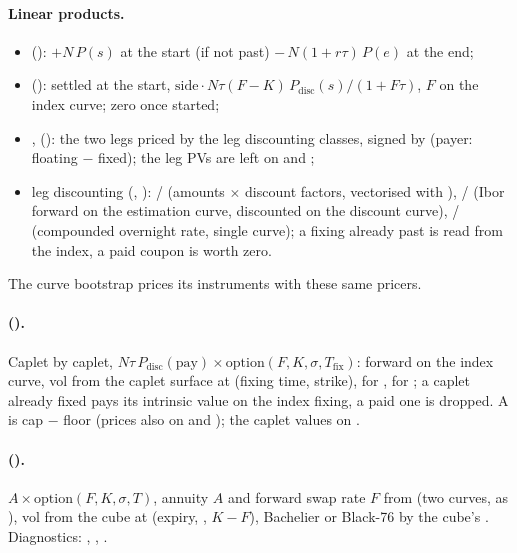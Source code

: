 \paragraph{Linear products.}
\begin{itemize}[nosep]
  \item {} (): $+N\,P(s)$ at the start (if not past) $-\,N(1 + r\tau)\,P(e)$ at the
        end;
  \item {} (): settled at the start,
        $\text{side}\cdot N\tau(F - K)\,P_{\text{disc}}(s)/(1 + F\tau)$, $F$ on the index curve; zero once started;
  \item {},  (): the two legs priced by the leg discounting
        classes, signed by  (payer: floating $-$ fixed); the leg PVs are left on
         and ;
  \item leg discounting (, ):  /
         (amounts $\times$ discount factors, vectorised with ),
         /  (Ibor forward on the estimation curve,
        discounted on the discount curve),  /  (compounded
        overnight rate, single curve); a fixing already past is read from the index, a paid coupon is worth zero.
\end{itemize}
The curve bootstrap prices its instruments with these same pricers.

\paragraph{ ().} Caplet by caplet, $N\tau\,P_{\text{disc}}(\text{pay})\times
\text{option}(F, K, \sigma, T_{\text{fix}})$: forward on the index curve, vol from the caplet surface
 at (fixing time, strike),  for 
,  for ; a caplet already fixed pays its intrinsic value on the
index fixing, a paid one is dropped. A  is cap $-$ floor (prices also on  and
); the caplet values on .

\paragraph{ ().} $A\times\text{option}(F, K, \sigma, T)$, annuity $A$ and
forward swap rate $F$ from  (two curves, as ), vol from the cube
 at (expiry, , $K - F$), Bachelier or Black-76 by the
cube's . Diagnostics: , , .

